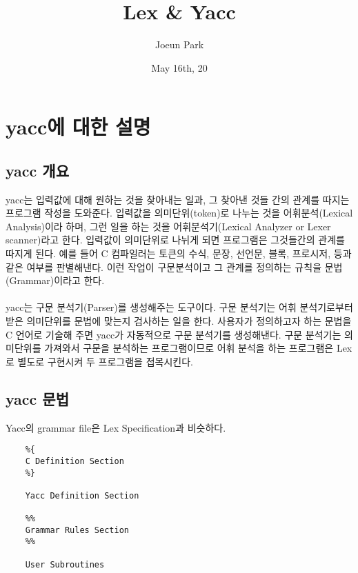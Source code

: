 \documentclass{article}
\begin{document}
\title{Lex \& Yacc}
\author{Joeun Park}
\date{May 16th, 20}
\maketitle


\section{yacc에 대한 설명}
\subsection{yacc 개요}
yacc는 입력값에 대해 원하는 것을 찾아내는 일과, 그 찾아낸 것들 간의 관계를 따지는 프로그램 작성을 도와준다. 입력값을 의미단위(token)로 나누는 것을 어휘분석(Lexical Analysis)이라 하며, 그런 일을 하는 것을 어휘분석기(Lexical Analyzer or Lexer scanner)라고 한다. 입력값이 의미단위로 나뉘게 되면 프로그램은 그것들간의 관계를 따지게 된다. 예를 들어 C 컴파일러는 토큰의 수식, 문장, 선언문, 블록, 프로시저, 등과 같은 여부를 판별해낸다. 이런 작업이 구문분석이고 그 관계를 정의하는 규칙을 문법(Grammar)이라고 한다. \\\\
yacc는 구문 분석기(Parser)를 생성해주는 도구이다. 구문 분석기는 어휘 분석기로부터 받은 의미단위를 문법에 맞는지 검사하는 일을 한다. 사용자가 정의하고자 하는 문법을 C 언어로 기술해 주면 yacc가 자동적으로 구문 분석기를 생성해낸다. 구문 분석기는 의미단위를 가져와서 구문을 분석하는 프로그램이므로 어휘 분석을 하는 프로그램은 Lex로 별도로 구현시켜 두 프로그램을 접목시킨다.\\

\subsection{yacc 문법}
Yacc의 grammar file은 Lex Specification과 비슷하다.

\begin{lstlisting}
    %{
    C Definition Section
    %}
    
    Yacc Definition Section
    
    %%
    Grammar Rules Section
    %%
    
    User Subroutines
\end{lstlisting}
\end{document}
